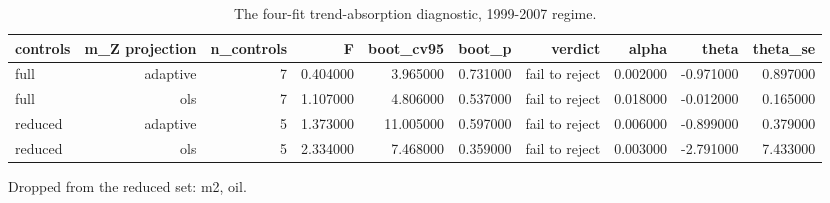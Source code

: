 \begin{table}[htbp]
\centering
\caption{The four-fit trend-absorption diagnostic, 1999-2007 regime.}
\label{tab:tab08_trend_absorption}
\begin{threeparttable}
\begin{tabular}{lrrrrrrrrr}
\toprule
controls & m\_Z projection & n\_controls & F & boot\_cv95 & boot\_p & verdict & alpha & theta & theta\_se \\
\midrule
full & adaptive & 7 & 0.404000 & 3.965000 & 0.731000 & fail to reject & 0.002000 & -0.971000 & 0.897000 \\
full & ols & 7 & 1.107000 & 4.806000 & 0.537000 & fail to reject & 0.018000 & -0.012000 & 0.165000 \\
reduced & adaptive & 5 & 1.373000 & 11.005000 & 0.597000 & fail to reject & 0.006000 & -0.899000 & 0.379000 \\
reduced & ols & 5 & 2.334000 & 7.468000 & 0.359000 & fail to reject & 0.003000 & -2.791000 & 7.433000 \\
\bottomrule
\end{tabular}

\begin{tablenotes}[flushleft]\small
\item Dropped from the reduced set: m2, oil.
\end{tablenotes}
\end{threeparttable}
\end{table}